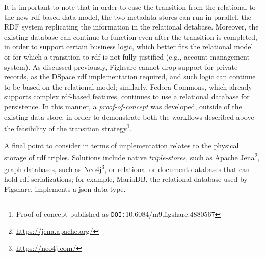 It is important to note that in order to ease the transition from the relational to the new \gls{rdf}-based data model, the two metadata stores can run in parallel, the RDF system replicating the information in the relational detabase. Moreover, the existing database can continue to function even after the transition is completed, in order to support certain business logic, which better fits the relational model or for which a transition to \gls{rdf} is not fully justified (e.g., account management system). As discussed previously, Fighsare cannot drop support for private records, as the DSpace \gls{rdf} implementation required\cite{dspacerdf}, and such logic can continue to be based on the relational model; similarly, Fedora Commons, which already supports complex \gls{rdf}-based features, continues to use a relational database for persistence. In this manner, a \emph{proof-of-concept}  was developed, outside of the existing data store, in order to demonstrate both the workflows described above the feasibility of the transition strategy\footnote{Proof-of-concept published as \texttt{DOI:}10.6084/m9.figshare.4880567}. 

A final point to consider in terms of implementation relates to the physical storage of \gls{rdf} triples. Solutions include native \emph{triple-stores}, such as Apache Jena\footnote{\url{https://jena.apache.org/}}, graph databases, such as Neo4j\footnote{\url{https://neo4j.com/}}, or relational or document databases that can hold \gls{rdf} serializations; for example, MariaDB, the relational database used by Figshare, implements a \gls{json} data type\cite{mariadb}.

